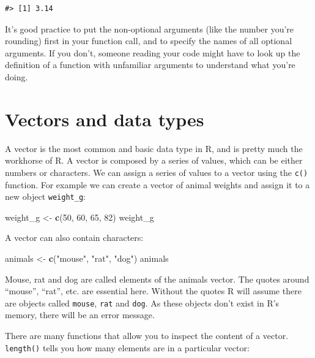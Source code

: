 \documentclass[]{book}
\newenvironment{Shaded}{\begin{snugshade}}{\end{snugshade}}
\newcommand{\KeywordTok}[1]{\textcolor[rgb]{0.13,0.29,0.53}{\textbf{#1}}}
\newcommand{\DecValTok}[1]{\textcolor[rgb]{0.00,0.00,0.81}{#1}}
\newcommand{\StringTok}[1]{\textcolor[rgb]{0.31,0.60,0.02}{#1}}
\newcommand{\NormalTok}[1]{#1}
\begin{document}
\begin{verbatim}
#> [1] 3.14
\end{verbatim}

It's good practice to put the non-optional arguments (like the number
you're rounding) first in your function call, and to specify the names
of all optional arguments. If you don't, someone reading your code might
have to look up the definition of a function with unfamiliar arguments
to understand what you're doing.

\section{Vectors and data types}\label{vectors-and-data-types}

A vector is the most common and basic data type in R, and is pretty much
the workhorse of R. A vector is composed by a series of values, which
can be either numbers or characters. We can assign a series of values to
a vector using the \texttt{c()} function. For example we can create a
vector of animal weights and assign it to a new object
\texttt{weight\_g}:

\begin{Shaded}
\begin{Highlighting}[]
\NormalTok{weight_g <-}\StringTok{ }\KeywordTok{c}\NormalTok{(}\DecValTok{50}\NormalTok{, }\DecValTok{60}\NormalTok{, }\DecValTok{65}\NormalTok{, }\DecValTok{82}\NormalTok{)}
\NormalTok{weight_g}
\end{Highlighting}
\end{Shaded}

A vector can also contain characters:

\begin{Shaded}
\begin{Highlighting}[]
\NormalTok{animals <-}\StringTok{ }\KeywordTok{c}\NormalTok{(}\StringTok{"mouse"}\NormalTok{, }\StringTok{"rat"}\NormalTok{, }\StringTok{"dog"}\NormalTok{)}
\NormalTok{animals}
\end{Highlighting}
\end{Shaded}

Mouse, rat and dog are called elements of the animals vector. The quotes
around ``mouse'', ``rat'', etc. are essential here. Without the quotes R
will assume there are objects called \texttt{mouse}, \texttt{rat} and
\texttt{dog}. As these objects don't exist in R's memory, there will be
an error message.

There are many functions that allow you to inspect the content of a
vector. \texttt{length()} tells you how many elements are in a
particular vector:
\end{document}
